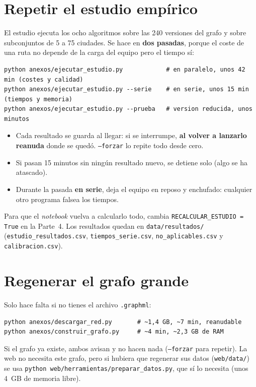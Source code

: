 \documentclass[11pt,a4paper,twoside,openany]{report}
\begin{document}
\section{Repetir el estudio empírico}

El estudio ejecuta los ocho algoritmos sobre las 240 versiones del grafo y sobre subconjuntos de 5 a 75 ciudades. Se hace en \textbf{dos pasadas}, porque el coste de una ruta no depende de la carga del equipo pero el tiempo sí:

\begin{lstlisting}
python anexos/ejecutar_estudio.py            # en paralelo, unos 42 min (costes y calidad)
python anexos/ejecutar_estudio.py --serie    # en serie, unos 15 min (tiempos y memoria)
python anexos/ejecutar_estudio.py --prueba   # version reducida, unos minutos
\end{lstlisting}

\begin{itemize}
  \item Cada resultado se guarda al llegar: si se interrumpe, \textbf{al volver a lanzarlo reanuda} donde se quedó. \texttt{--forzar} lo repite todo desde cero.
  \item Si pasan 15 minutos sin ningún resultado nuevo, se detiene solo (algo se ha atascado).
  \item Durante la pasada \textbf{en serie}, deja el equipo en reposo y enchufado: cualquier otro programa falsea los tiempos.
\end{itemize}

Para que el \emph{notebook} vuelva a calcularlo todo, cambia \texttt{RECALCULAR\_ESTUDIO = True} en la Parte~4. Los resultados quedan en \texttt{data/resultados/} (\texttt{estudio\_resultados.csv}, \texttt{tiempos\_serie.csv}, \texttt{no\_aplicables.csv} y \texttt{calibracion.csv}).

\section{Regenerar el grafo grande}

Solo hace falta si no tienes el archivo \texttt{.graphml}:
\begin{lstlisting}
python anexos/descargar_red.py       # ~1,4 GB, ~7 min, reanudable
python anexos/construir_grafo.py     # ~4 min, ~2,3 GB de RAM
\end{lstlisting}
Si el grafo ya existe, ambos avisan y no hacen nada (\texttt{--forzar} para repetir). La web no necesita este grafo, pero si hubiera que regenerar sus datos (\texttt{web/data/}) se usa \texttt{python web/herramientas/preparar\_datos.py}, que sí lo necesita (unos 4~GB de memoria libre).
\end{document}
